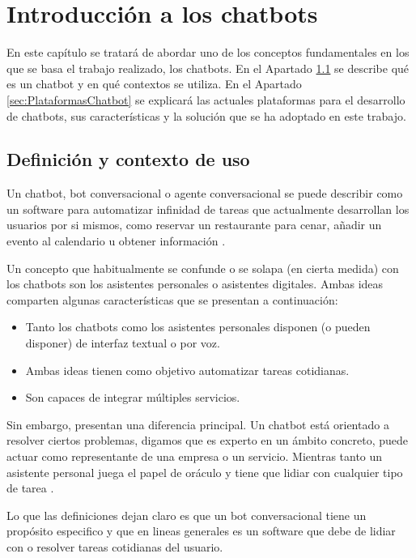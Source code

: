 \chapter{Introducción a los chatbots}
\label{cha:IntroChatbot}

En este capítulo se tratará de abordar uno de los conceptos fundamentales en los que se basa el trabajo realizado, los chatbots. En el Apartado \ref{sec:DefinicionChatbot} se describe qué es un chatbot y en qué contextos se utiliza. En el Apartado \ref{sec:PlataformasChatbot} se explicará las actuales plataformas para el desarrollo de chatbots, sus características y la solución que se ha adoptado en este trabajo.

\section{Definición y contexto de uso}
\label{sec:DefinicionChatbot}

Un chatbot, bot conversacional o agente conversacional se puede describir como un software para automatizar infinidad de tareas que actualmente desarrollan los usuarios por si mismos, como reservar un restaurante para cenar, añadir un evento al calendario u obtener información \cite{Wagner2016}.

Un concepto que habitualmente se confunde o se solapa (en cierta medida) con los chatbots son los asistentes personales o asistentes digitales. Ambas ideas comparten algunas características que se presentan a continuación:
\begin{itemize}
	\item Tanto los chatbots como los asistentes personales disponen (o pueden disponer) de interfaz textual o por voz.
	\item Ambas ideas tienen como objetivo automatizar tareas cotidianas.
	\item Son capaces de integrar múltiples servicios.
\end{itemize}

Sin embargo, presentan una diferencia principal. Un chatbot está orientado a resolver ciertos problemas, digamos que es experto en un ámbito concreto, puede actuar como representante de una empresa o un servicio. Mientras tanto un asistente personal juega el papel de oráculo y tiene que lidiar con cualquier tipo de tarea \cite{Wright2016}.

Lo que las definiciones dejan claro es que un bot conversacional tiene un propósito especifico y que en lineas generales es un software que debe de lidiar con o resolver tareas cotidianas del usuario.


